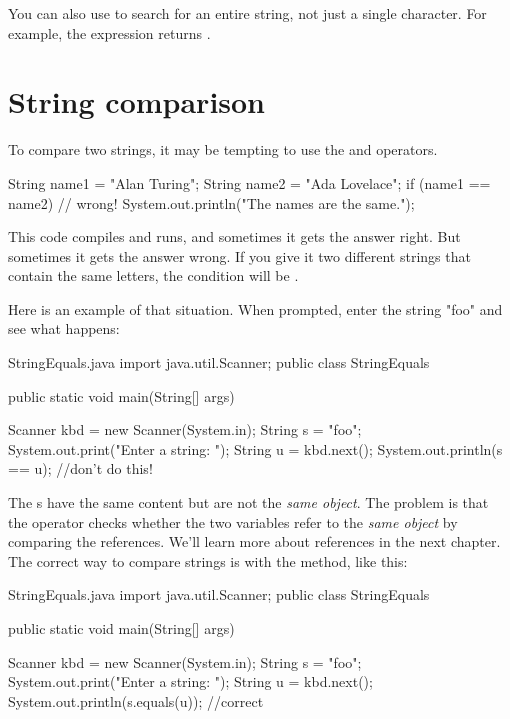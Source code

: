 You can also use  to search for an entire string, not just a single character.
For example, the expression  returns .


\section{String comparison}
\label{strcmp}


To compare two strings, it may be tempting to use the \java{==} and \java{!=} operators.

\begin{code}
String name1 = "Alan Turing";
String name2 = "Ada Lovelace";
if (name1 == name2) {                 // wrong!
    System.out.println("The names are the same.");
}
\end{code}

This code compiles and runs, and sometimes it gets the answer right.
But sometimes it gets the answer wrong.
If you give it two different strings that contain the same letters, the condition will be .

Here is an example of that situation.  When prompted, enter the string "foo" and see what happens:

\begin{trinket} [220] {StringEquals.java}
import java.util.Scanner;
public class StringEquals {
   public static void main(String[] args) {
    
      Scanner kbd = new Scanner(System.in);
      String s = "foo";
      System.out.print("Enter a string: ");
      String u = kbd.next();
      System.out.println(s == u); //don't do this!
   }
}
\end{trinket}

The s have the same content but are not the \textit{same object}.
The problem is that the \java{==} operator checks whether the two variables refer to the {\em same object} by comparing the references.
We'll learn more about references in the next chapter.
The correct way to compare strings is with the  method, like this:

\begin{trinket} [220] {StringEquals.java}
import java.util.Scanner;
public class StringEquals {
    public static void main(String[] args) {
    
       Scanner kbd = new Scanner(System.in);
       String s = "foo";
       System.out.print("Enter a string: ");
       String u = kbd.next();
       System.out.println(s.equals(u)); //correct
    }
}
\end{trinket}

